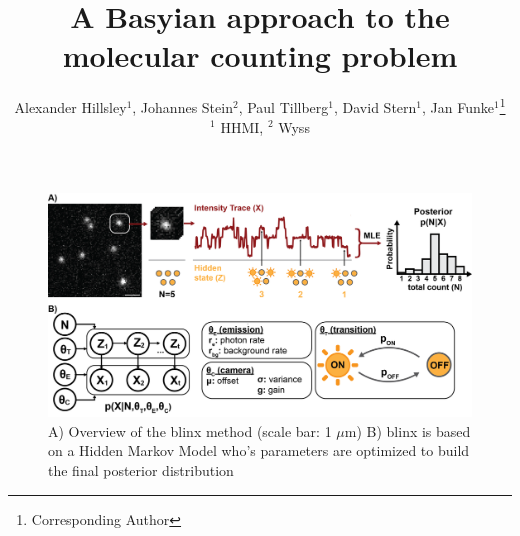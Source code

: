 \documentclass[twocolumn]{article}
\begin{document}
\title{A Basyian approach to the molecular counting problem}

\author{
  Alexander Hillsley$^{1}$,
  Johannes Stein$^{2}$,
  Paul Tillberg$^{1}$,
  David Stern$^{1}$,
  Jan Funke$^{1}$\thanks{Corresponding Author}

  \normalsize{$^1$ HHMI},
  \normalsize{$^2$ Wyss}
}

\maketitle





\begin{figure}
  \includegraphics[width=\linewidth]{figures/fig_1.png}
  \caption{A) Overview of the blinx method (scale bar: 1 $\mu$m) B) blinx is based on a Hidden Markov Model who's parameters are optimized to build the final posterior
  distribution}
  \label{fig:method:overview}
\end{figure}


\end{document}
